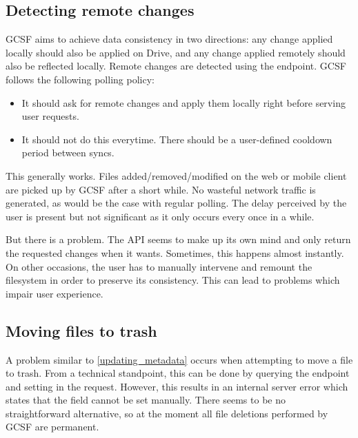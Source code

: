 \subsection{Detecting remote changes}

GCSF aims to achieve data consistency in two directions: any change applied locally should also be applied on Drive, and any change applied remotely should also be reflected locally. Remote changes are detected using the  endpoint. GCSF follows the following polling policy:

\begin{itemize}
  \item It should ask for remote changes and apply them locally right before serving user requests.
  \item It should not do this everytime. There should be a user-defined cooldown period between syncs.
\end{itemize}

This generally works. Files added/removed/modified on the web or mobile client are picked up by GCSF after a short while. No wasteful network traffic is generated, as would be the case with regular polling. The delay perceived by the user is present but not significant as it only occurs every once in a while.

But there is a problem. The API seems to make up its own mind and only return the requested changes when it wants. Sometimes, this happens almost instantly. On other occasions, the user has to manually intervene and remount the filesystem in order to preserve its consistency. This can lead to problems which impair user experience.

\subsection{Moving files to trash}

A problem similar to \ref{updating_metadata} occurs when attempting to move a file to trash. From a technical standpoint, this can be done by querying the  endpoint and setting  in the request. However, this results in an internal server error which states that the  field cannot be set manually. There seems to be no straightforward alternative, so at the moment all file deletions performed by GCSF are permanent.
